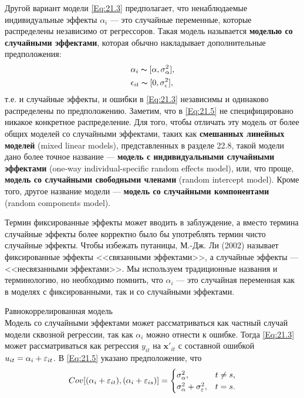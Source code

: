 Другой вариант модели \ref{Eq:21.3} предполагает, что ненаблюдаемые индивидуальные эффекты $\alpha_i$ --- это случайные переменные, которые распределены независимо от регрессоров. Такая модель называется \textbf{моделью со случайными эффектами}, которая обычно накладывает дополнительные предположения:
\begin{align} \label{Eq:21.5}
 & \alpha_i  \thicksim [\alpha, \sigma^2_{\alpha}],  \\ 
& \epsilon_{it}  \thicksim [0, \sigma^2_{\epsilon}], %
\end{align}
т.е. и случайные эффекты, и ошибки в \ref{Eq:21.3} независимы и одинаково распределены по предположению. Заметим, что в  \ref{Eq:21.5} не специфицировано никакое конкретное распределение. Для того, чтобы отличать эту модель от более общих моделей со случайными эффектами, таких как \textbf{смешанных линейных моделей} (mixed linear models), представленных в разделе 22.8, такой модели дано более точное название  --- \textbf{модель с индивидуальными случайными эффектами} (one-way individual-specific random effects model), или, что проще, \textbf{модель со случайными свободными членами} (random intercept model). Кроме того, другое название модели --- \textbf{модель со случайными компонентами} (random components model). 

Термин фиксированные эффекты может вводить в заблуждение, а вместо термина случайные эффекты более корректно было бы употреблять термин чисто случайные эффекты. Чтобы избежать путаницы, М.-Дж. Ли (2002)  называет фиксированные эффекты <<связанными эффектами>>, а случайные эффекты --- <<несвязанными эффектами>>. Мы используем традиционные названия и терминологию, но необходимо помнить, что $\alpha_i$  --- это случайная переменная как в моделях с фиксированными, так и со случайными эффектами.


{\centering
Равнокоррелированная модель\\}
Модель со случайными эффектами может рассматриваться как частный случай модели сквозной регрессии, так как $\alpha_i$ можно отнести к ошибке. Тогда \ref{Eq:21.3} может рассматриваться как регрессия $y_{it}$ на $\mathbf x'_{it}$ с составной ошибкой $u_{it}=\alpha_i+\varepsilon_{it}$. В \ref{Eq:21.5} указано предположение, что 
\begin{align}
Cov[(\alpha_i+\varepsilon_{it}), (\alpha_i+\varepsilon_{is})]= 
	\begin{cases}
		\sigma^2_{\alpha}, & t\neq s, \\
		\sigma^2_{\alpha} + \sigma^2_{\varepsilon}, & t=s.
	\end{cases}
\label{Eq:21.6}
\end{align}


